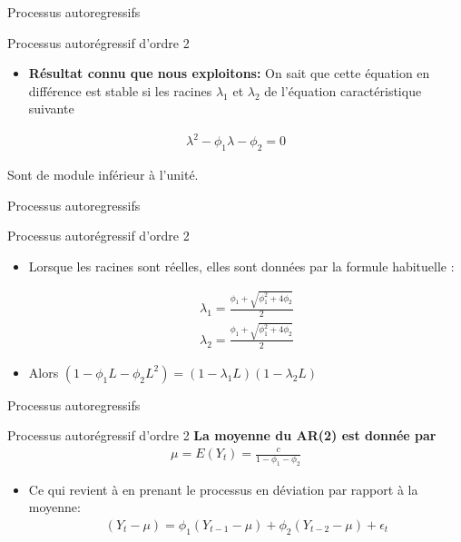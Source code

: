 \documentclass{beamer}
\begin{document}
\begin{frame}{Processus autoregressifs}
\begin{block}{Processus autorégressif d’ordre 2}

\begin{itemize}
\item \textbf{Résultat connu que nous exploitons:} On sait que cette équation en différence est stable si les racines $\lambda_1$ et $\lambda_2$ de l’équation caractéristique suivante
\end{itemize}
\begin{align*}
\lambda^2-\phi_1\lambda-\phi_2=0
\end{align*}
\begin{itemize}
Sont de module inférieur à l’unité.

\end{itemize}
\end{block}
\end{frame}

\begin{frame}{Processus autoregressifs}
\begin{block}{Processus autorégressif d’ordre 2}
\begin{itemize}
\item Lorsque les racines sont réelles, elles sont données par la formule habituelle :

\begin{align*}
\lambda_1 = \frac{\phi_1+\sqrt{\phi_1^2+4\phi_2}}{2}
\end{align*}
\begin{align*}
\lambda_2 = \frac{\phi_1+\sqrt{\phi_1^2+4\phi_2}}{2}
\end{align*}
\item Alors $(1-\phi_1 L-\phi_2 L^2  )=(1-\lambda_1L)(1-\lambda_2L)$
\end{itemize}

\end{block}
\end{frame}



\begin{frame}{Processus autoregressifs}
\begin{block}{Processus autorégressif d’ordre 2}
\textbf{La moyenne du AR(2) est donnée par}
\begin{align*}
\mu=E(Y_t)=\frac{c}{1-\phi_1-\phi_2}
\end{align*}
\begin{itemize}
\item Ce qui revient à  en prenant le processus en déviation par rapport à la moyenne:
\begin{align*}
(Y_t-\mu)=\phi_1(Y_{t-1}-\mu)+\phi_2(Y_{t-2}-\mu)+\epsilon_t
\end{align*}
\end{itemize}
\end{block}
\end{frame}
\end{document}
